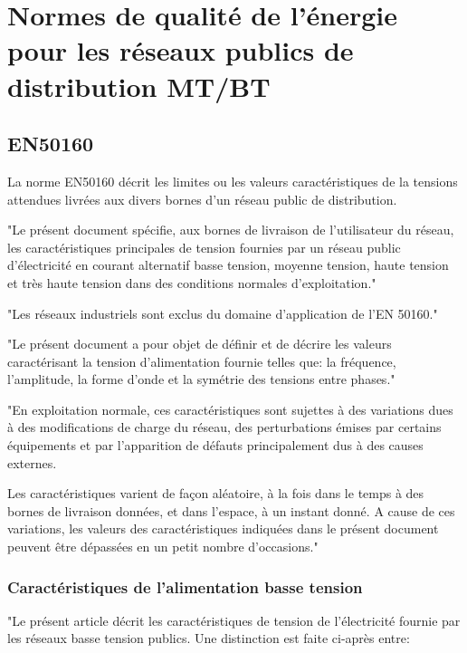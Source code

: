 \section{Normes de qualité de l'énergie pour les réseaux publics de distribution MT/BT}

\subsection{EN50160}

La norme EN50160 \cite{en50160} décrit les limites ou les valeurs caractéristiques de la tensions attendues livrées aux divers bornes d'un réseau public de distribution.

"Le présent document spécifie, aux bornes de livraison de l'utilisateur du réseau, les caractéristiques principales de tension fournies par un réseau public d'électricité en courant alternatif basse tension, moyenne tension, haute tension et très haute tension dans des conditions normales d'exploitation."

"Les réseaux industriels sont exclus du domaine d'application de l'EN 50160."

"Le présent document a pour objet de définir et de décrire les valeurs caractérisant la tension d'alimentation fournie telles que: la fréquence, l'amplitude, la forme d'onde et la symétrie des tensions entre phases."

"En exploitation normale, ces caractéristiques sont sujettes à des variations dues à des modifications de charge du réseau, des perturbations émises par certains équipements et par l'apparition de défauts principalement dus à des causes externes.

Les caractéristiques varient de façon aléatoire, à la fois dans le temps à des bornes de livraison données, et dans l'espace, à un instant donné. A cause de ces variations, les valeurs des caractéristiques indiquées dans le présent document peuvent être dépassées en un petit nombre d'occasions."





\subsubsection{Caractéristiques de l'alimentation basse tension}

"Le présent article décrit les caractéristiques de tension de l'électricité fournie par les réseaux basse tension publics. Une distinction est faite ci-après entre:

